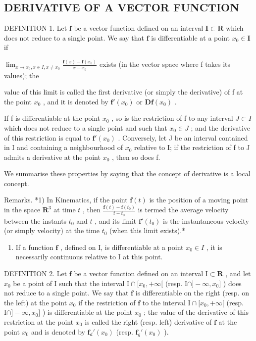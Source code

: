\subsection{DERIVATIVE OF A VECTOR FUNCTION}

DEFINITION 1. Let \(\mathbf{f}\) be a vector function defined on an interval \(\mathbf{I} \subset \mathbf{R}\) which does not reduce to a single point. We say that \(\mathbf{f}\) is differentiable at a point \(x_0 \in \mathbf{I}\) if

\(\lim_{x\to x_{0},x\in I,x\neq x_{0}}\frac{\mathbf{f}(x)-\mathbf{f}(x_{0})}{x-x_{0}}\) exists (in the vector space where f takes its values); the

value of this limit is called the first derivative (or simply the derivative) of f at the point \(x_{0}\) , and it is denoted by \(\mathbf{f}'(x_{0})\) or \(\mathbf{D}\mathbf{f}(x_{0})\) .

If f is differentiable at the point \(x_{0}\) , so is the restriction of f to any interval \(J \subset I\) which does not reduce to a single point and such that \(x_{0} \in J\) ; and the derivative of this restriction is equal to \(\mathbf{f}'(x_{0})\) . Conversely, let J be an interval contained in I and containing a neighbourhood of \(x_{0}\) relative to I; if the restriction of f to J admits a derivative at the point \(x_{0}\) , then so does f.

We summarise these properties by saying that the concept of derivative is a local concept.

Remarks. *1) In Kinematics, if the point \(\mathbf{f}(t)\) is the position of a moving point in the space \(\mathbf{R}^3\) at time \(t\) , then \(\frac{\mathbf{f}(t) - \mathbf{f}(t_0)}{t - t_0}\) is termed the average velocity between the instants \(t_0\) and \(t\) , and its limit \(\mathbf{f}'(t_0)\) is the instantaneous velocity (or simply velocity) at the time \(t_0\) (when this limit exists).*

\begin{enumerate}
\def\labelenumi{\arabic{enumi})}
\setcounter{enumi}{1}
\tightlist
\item
  If a function \(\mathbf{f}\) , defined on I, is differentiable at a point \(x_0 \in I\) , it is necessarily continuous relative to I at this point.
\end{enumerate}

DEFINITION 2. Let \(\mathbf{f}\) be a vector function defined on an interval \(\mathrm{I} \subset \mathbf{R}\) , and let \(x_0\) be a point of \(\mathrm{I}\) such that the interval \(\mathrm{I} \cap [x_0, +\infty[\) (resp. \(\mathrm{I} \cap ] - \infty, x_0]\) ) does not reduce to a single point. We say that \(\mathbf{f}\) is differentiable on the right (resp. on the left) at the point \(x_0\) if the restriction of \(\mathbf{f}\) to the interval \(\mathrm{I} \cap [x_0, +\infty[\) (resp. \(\mathrm{I} \cap ] - \infty, x_0]\) ) is differentiable at the point \(x_0\) ; the value of the derivative of this restriction at the point \(x_0\) is called the right (resp. left) derivative of \(\mathbf{f}\) at the point \(x_0\) and is denoted by \(\mathbf{f}_d'(x_0)\) (resp. \(\mathbf{f}_g'(x_0)\) ).

